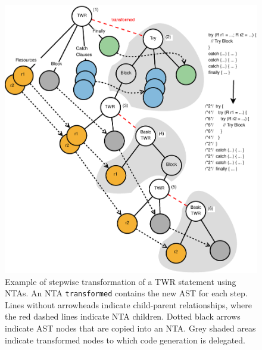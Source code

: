 {%



\begin{figure}
	\centering
	\includegraphics[width=\columnwidth]{figures/TWRtransform.eps}
	\caption{Example of stepwise transformation of a TWR statement using NTAs.
	An NTA \texttt{transformed} contains the new AST for each step.
	Lines without arrowheads indicate child-parent relationships, where the
	red dashed lines indicate NTA children. Dotted black arrows indicate AST
	nodes that are copied into an NTA. Grey shaded areas indicate transformed
	nodes to which code generation is delegated.}
	\label{TWRexpansion}
\end{figure}

}
